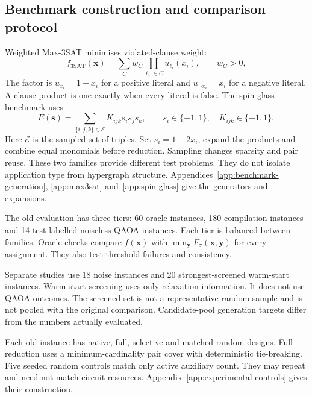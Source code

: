 \documentclass[a4paper,onecolumn,11pt,unpublished]{quantumarticle}
\theoremstyle{remark}
\begin{document}
\subsection{Benchmark construction and comparison protocol}
\label{sec:benchmark-protocol}

Weighted Max-3SAT minimises violated-clause weight:
\begin{equation}
 f_{\mathrm{3SAT}}(\bm x)=\sum_C w_C\prod_{\ell_i\in C}u_{\ell_i}(x_i),
 \qquad w_C>0,
 \label{eq:methods-max3sat}
\end{equation}
The factor is $u_{x_i}=1-x_i$ for a positive literal and
$u_{\neg x_i}=x_i$ for a negative literal.
A clause product is one exactly when every literal is false.
The spin-glass benchmark uses
\begin{equation}
 E(\bm s)=\sum_{\{i,j,k\}\in\mathcal E}K_{ijk}s_is_js_k,
 \qquad s_i\in\{-1,1\},\quad K_{ijk}\in\{-1,1\},
 \label{eq:methods-cubic-spin}
\end{equation}
Here $\mathcal E$ is the sampled set of triples.
Set $s_i=1-2x_i$, expand the products and combine equal monomials before
reduction. Sampling changes sparsity and pair reuse.
These two families provide different test problems. They do not isolate
application type from hypergraph structure.
Appendices~\ref{app:benchmark-generation}, \ref{app:max3sat}
and~\ref{app:spin-glass} give the generators and expansions.

The old evaluation has three tiers: 60 oracle instances, 180 compilation
instances and 14 test-labelled noiseless QAOA instances.
Each tier is balanced between families.
Oracle checks compare $f(\bm x)$ with $\min_{\bm y}F_\sigma(\bm x,\bm y)$
for every assignment. They also test threshold failures and consistency.

Separate studies use 18 noise instances and 20 strongest-screened warm-start
instances. Warm-start screening uses only relaxation information.
It does not use QAOA outcomes. The screened set is not a representative
random sample and is not pooled with the original comparison.
Candidate-pool generation targets differ from the numbers actually evaluated.

Each old instance has native, full, selective and matched-random designs.
Full reduction uses a minimum-cardinality pair cover with deterministic
tie-breaking. Five seeded random controls match only active auxiliary count.
They may repeat and need not match circuit resources.
Appendix~\ref{app:experimental-controls} gives their construction.
\end{document}
